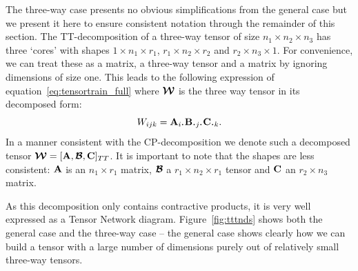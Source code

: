 The three-way case presents no obvious simplifications from the general case but we present it
here to ensure consistent notation through the remainder of this section. The TT-decomposition
of a three-way tensor of size \(n_1 \times n_2 \times n_3\) has three `cores' with shapes
\(1 \times n_1 \times r_1\), \(r_1 \times n_2 \times r_2\) and \(r_2 \times n_3 \times 1\). For
convenience, we can treat these as a matrix, a three-way tensor and a matrix by ignoring 
dimensions of size one. This leads to the following expression of 
equation~\ref{eq:tensortrain_full} where \(\bm{\mathcal{W}}\) is the three way tensor in its
decomposed form:
\begin{equation} \label{eq:tensortrain_three}
	W_{ijk} = \mat{A}_{i\midbullet} \mat{B}_{\midbullet j \midbullet} \mat{C}_{\midbullet k}.
\end{equation} In a manner consistent with the CP-decomposition we denote such a decomposed
tensor \(\bm{\mathcal{W}} = [\mathbf{A},\bm{\mathcal{B}},\mathbf{C}]_{TT}\). It is important to note that the
shapes are less consistent: \(\mathbf{A}\) is an \(n_1 \times r_1\) matrix, \(\bm{\mathcal{B}}\) a
\(r_1 \times n_2 \times r_1\) tensor and \(\mathbf{C}\) an \(r_2 \times n_3\) matrix.

As this decomposition only contains contractive products, it is very well expressed as a Tensor
Network diagram. Figure~\ref{fig:tttnds} shows both the general case and the three-way case --
the general case shows clearly how we can build a tensor with a large number of dimensions purely
out of relatively small three-way tensors. 

